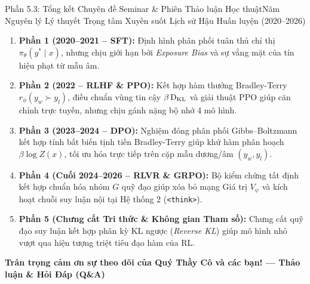 \begin{frame}{Phần 5.3: Tổng kết Chuyên đề Seminar \& Phiên Thảo luận Học thuật}{Năm Nguyên lý Lý thuyết Trọng tâm Xuyên suốt Lịch sử Hậu Huấn luyện (2020--2026)}
  \scriptsize
  \begin{enumerate}\setlength{\itemsep}{5pt}
    \item \textbf{Phần 1 (2020--2021 -- SFT):} Định hình phân phối tuân thủ chỉ thị $\pi_\theta(y^* \mid x)$, nhưng chịu giới hạn bởi \textit{Exposure Bias} và sự vắng mặt của tín hiệu phạt từ mẫu âm.
    \item \textbf{Phần 2 (2022 -- RLHF \& PPO):} Kết hợp hàm thưởng Bradley-Terry $r_\phi(y_w \succ y_l)$, điều chuẩn vùng tin cậy $\beta \operatorname{D_{\mathrm{KL}}}$ và giải thuật PPO giúp căn chỉnh trực tuyến, nhưng chịu gánh nặng bộ nhớ 4 mô hình.
    \item \textbf{Phần 3 (2023--2024 -- DPO):} Nghiệm đóng phân phối Gibbs--Boltzmann kết hợp tính bất biến tịnh tiến Bradley-Terry giúp khử hàm phân hoạch $\beta \log Z(x)$, tối ưu hóa trực tiếp trên cặp mẫu dương/âm $(y_w, y_l)$.
    \item \textbf{Phần 4 (Cuối 2024--2026 -- RLVR \& GRPO):} Bộ kiểm chứng tất định kết hợp chuẩn hóa nhóm $G$ quỹ đạo giúp xóa bỏ mạng Giá trị $V_\psi$ và kích hoạt chuỗi suy luận nội tại Hệ thống 2 (\texttt{<think>}).
    \item \textbf{Phần 5 (Chưng cất Tri thức \& Không gian Tham số):} Chưng cất quỹ đạo suy luận kết hợp phân kỳ KL ngược (\textit{Reverse KL}) giúp mô hình nhỏ vượt qua hiện tượng triệt tiêu đạo hàm của RL.
  \end{enumerate}

  \vspace{0.08cm}
  \begin{center}
    \normalsize \textbf{\textcolor{navyblue}{Trân trọng cảm ơn sự theo dõi của Quý Thầy Cô và các bạn! --- Thảo luận \& Hỏi Đáp (Q\&A)}}
  \end{center}
\end{frame}
